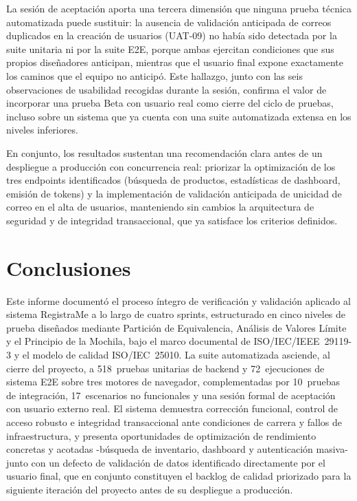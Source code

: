 \documentclass[conference]{IEEEtran}
\begin{document}
La sesión de aceptación aporta una tercera dimensión que ninguna prueba técnica automatizada puede sustituir: la ausencia de validación anticipada de correos duplicados en la creación de usuarios (UAT-09) no había sido detectada por la suite unitaria ni por la suite E2E, porque ambas ejercitan condiciones que sus propios diseñadores anticipan, mientras que el usuario final expone exactamente los caminos que el equipo no anticipó. Este hallazgo, junto con las seis observaciones de usabilidad recogidas durante la sesión, confirma el valor de incorporar una prueba Beta con usuario real como cierre del ciclo de pruebas, incluso sobre un sistema que ya cuenta con una suite automatizada extensa en los niveles inferiores.

En conjunto, los resultados sustentan una recomendación clara antes de un despliegue a producción con concurrencia real: priorizar la optimización de los tres endpoints identificados (búsqueda de productos, estadísticas de dashboard, emisión de tokens) y la implementación de validación anticipada de unicidad de correo en el alta de usuarios, manteniendo sin cambios la arquitectura de seguridad y de integridad transaccional, que ya satisface los criterios definidos.

\section{Conclusiones}
\label{sec:conclusion}

Este informe documentó el proceso íntegro de verificación y validación aplicado al sistema RegistraMe a lo largo de cuatro sprints, estructurado en cinco niveles de prueba diseñados mediante Partición de Equivalencia, Análisis de Valores Límite y el Principio de la Mochila, bajo el marco documental de ISO/IEC/IEEE~29119-3 y el modelo de calidad ISO/IEC~25010. La suite automatizada asciende, al cierre del proyecto, a 518~pruebas unitarias de backend y 72~ejecuciones de sistema E2E sobre tres motores de navegador, complementadas por 10~pruebas de integración, 17~escenarios no funcionales y una sesión formal de aceptación con usuario externo real. El sistema demuestra corrección funcional, control de acceso robusto e integridad transaccional ante condiciones de carrera y fallos de infraestructura, y presenta oportunidades de optimización de rendimiento concretas y acotadas -búsqueda de inventario, dashboard y autenticación masiva- junto con un defecto de validación de datos identificado directamente por el usuario final, que en conjunto constituyen el backlog de calidad priorizado para la siguiente iteración del proyecto antes de su despliegue a producción.



\end{document}

